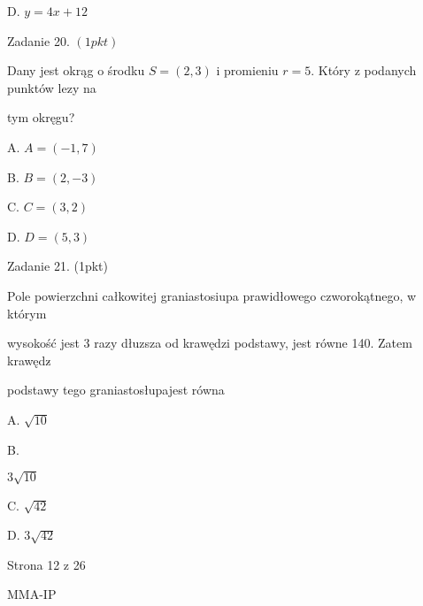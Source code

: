 \documentclass[a4paper,12pt]{article}
\begin{document}
D. $y=4x+12$

Zadanie 20. $(1pkt)$

Dany jest okrąg o środku $S=(2,3)$ i promieniu $r=5$. Który z podanych punktów lezy na

tym okręgu?

A. $A=(-1,7)$

B. $B=(2,-3)$

C. $C=(3,2)$

D. $D=(5,3)$

Zadanie 21. (1pkt)

Pole powierzchni całkowitej graniastosiupa prawidłowego czworokątnego, w którym

wysokość jest 3 razy dłuzsza od krawędzi podstawy, jest równe 140. Zatem krawędz$\acute{}$

podstawy tego graniastosłupajest równa

A. $\sqrt{10}$

B.

$3\sqrt{10}$

C. $\sqrt{42}$

D. $3\sqrt{42}$

Strona 12 z 26

MMA-IP
\end{document}
